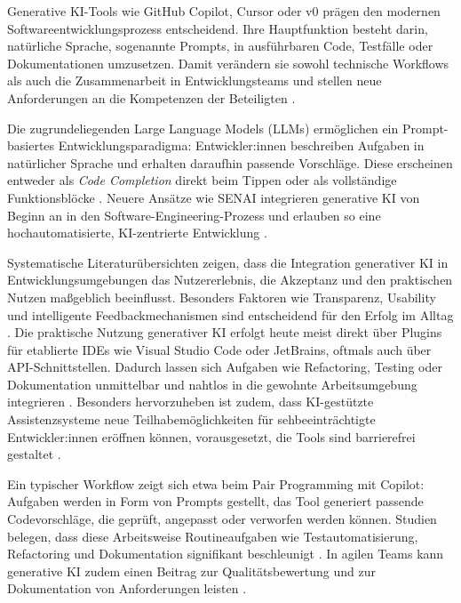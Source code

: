 \label{sec:generative-ki-tools}

Generative KI-Tools wie GitHub Copilot, Cursor oder v0 prägen den modernen
Softwareentwicklungsprozess entscheidend. Ihre Hauptfunktion besteht darin,
natürliche Sprache, sogenannte Prompts, in ausführbaren Code, Testfälle oder
Dokumentationen umzusetzen. Damit verändern sie sowohl technische Workflows als
auch die Zusammenarbeit in Entwicklungsteams und stellen neue Anforderungen an
die Kompetenzen der Beteiligten \cite{weisz_design_2024}.

Die zugrundeliegenden Large Language Models (LLMs) ermöglichen ein
Prompt-basiertes Entwicklungsparadigma: Entwickler:innen beschreiben Aufgaben
in natürlicher Sprache und erhalten daraufhin passende Vorschläge. Diese
erscheinen entweder als \textit{Code Completion} direkt beim Tippen oder als
vollständige Funktionsblöcke \cite{kerr_github_nodate, weisz_design_2024}.
Neuere Ansätze wie SENAI integrieren generative KI von Beginn an in den
Software-Engineering-Prozess und erlauben so eine hochautomatisierte,
KI-zentrierte Entwicklung \cite{saad_senai_2025}.

Systematische Literaturübersichten zeigen, dass die Integration generativer KI
in Entwicklungsumgebungen das Nutzererlebnis, die Akzeptanz und den praktischen
Nutzen maßgeblich beeinflusst. Besonders Faktoren wie Transparenz, Usability
und intelligente Feedbackmechanismen sind entscheidend für den Erfolg im Alltag
\cite{sergeyuk_human-ai_2025}. Die praktische Nutzung generativer KI erfolgt
heute meist direkt über Plugins für etablierte IDEs wie Visual Studio Code oder
JetBrains, oftmals auch über API-Schnittstellen. Dadurch lassen sich Aufgaben
wie Refactoring, Testing oder Dokumentation unmittelbar und nahtlos in die
gewohnte Arbeitsumgebung integrieren \cite{kerr_github_nodate,
    shi_ai-assisted_2023, weisz_design_2024}. Besonders hervorzuheben ist zudem,
dass KI-gestützte Assistenzsysteme neue Teilhabemöglichkeiten für
sehbeeinträchtigte Entwickler:innen eröffnen können, vorausgesetzt, die Tools
sind barrierefrei gestaltet \cite{flores-saviaga_impact_2025}.

Ein typischer Workflow zeigt sich etwa beim Pair Programming mit Copilot:
Aufgaben werden in Form von Prompts gestellt, das Tool generiert passende
Codevorschläge, die geprüft, angepasst oder verworfen werden können. Studien
belegen, dass diese Arbeitsweise Routineaufgaben wie Testautomatisierung,
Refactoring und Dokumentation signifikant beschleunigt
\cite{kerr_github_nodate, weisz_design_2024, shi_ai-assisted_2023}. In agilen
Teams kann generative KI zudem einen Beitrag zur Qualitätsbewertung und zur
Dokumentation von Anforderungen leisten \cite{geyer_case_2025}.

